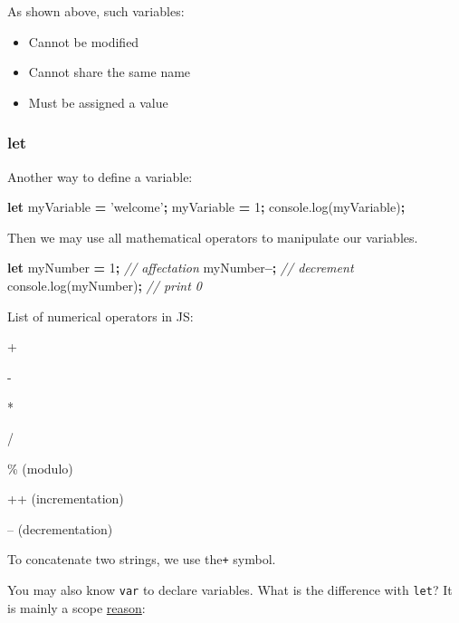 \documentclass[]{book}
\newenvironment{Shaded}{\begin{snugshade}}{\end{snugshade}}
\newcommand{\AttributeTok}[1]{\textcolor[rgb]{0.77,0.63,0.00}{#1}}
\newcommand{\CommentTok}[1]{\textcolor[rgb]{0.56,0.35,0.01}{\textit{#1}}}
\newcommand{\DecValTok}[1]{\textcolor[rgb]{0.00,0.00,0.81}{#1}}
\newcommand{\KeywordTok}[1]{\textcolor[rgb]{0.13,0.29,0.53}{\textbf{#1}}}
\newcommand{\NormalTok}[1]{#1}
\newcommand{\OperatorTok}[1]{\textcolor[rgb]{0.81,0.36,0.00}{\textbf{#1}}}
\newcommand{\StringTok}[1]{\textcolor[rgb]{0.31,0.60,0.02}{#1}}
\newcommand{\VariableTok}[1]{\textcolor[rgb]{0.00,0.00,0.00}{#1}}
\providecommand{\tightlist}{%
  \setlength{\itemsep}{0pt}\setlength{\parskip}{0pt}}
\begin{document}
As shown above, such variables:

\begin{itemize}
\tightlist
\item
  Cannot be modified
\item
  Cannot share the same name
\item
  Must be assigned a value
\end{itemize}

\hypertarget{let}{%
\subsubsection{let}\label{let}}

Another way to define a variable:

\begin{Shaded}
\begin{Highlighting}[]
\KeywordTok{let}\NormalTok{ myVariable }\OperatorTok{=} \StringTok{'welcome'}\OperatorTok{;}
\NormalTok{myVariable }\OperatorTok{=} \DecValTok{1}\OperatorTok{;}
\VariableTok{console}\NormalTok{.}\AttributeTok{log}\NormalTok{(myVariable)}\OperatorTok{;}
\end{Highlighting}
\end{Shaded}

Then we may use all mathematical operators to manipulate our variables.

\begin{Shaded}
\begin{Highlighting}[]
\KeywordTok{let}\NormalTok{ myNumber }\OperatorTok{=} \DecValTok{1}\OperatorTok{;} \CommentTok{// affectation}
\NormalTok{myNumber}\OperatorTok{--;} \CommentTok{// decrement}
\VariableTok{console}\NormalTok{.}\AttributeTok{log}\NormalTok{(myNumber)}\OperatorTok{;} \CommentTok{// print 0}
\end{Highlighting}
\end{Shaded}

List of numerical operators in JS:

+

-

*

/

\% (modulo)

++ (incrementation)

-- (decrementation)

To concatenate two strings, we use the\texttt{+} symbol.

You may also know \texttt{var} to declare variables. What is the difference with \texttt{let}? It is mainly a scope \href{https://www.w3schools.com/js/js_let.asp}{reason}:
\end{document}
